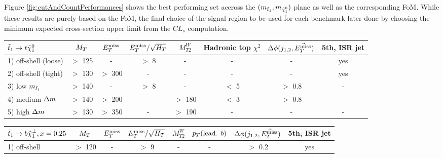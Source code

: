     Figure \ref{fig:cutAndCountPerformances} shows the best performing set accross the 
    $(m_{\tilde{t}_1},m_{\tilde{\chi}_1^0})$ plane as well as the corresponding FoM. While
    these results are purely based on the FoM, the final choice of the signal region to
    be used for each benchmark later done by choosing the minimum expected cross-section 
    upper limit from the $CL_s$ computation.

\begin{table}[!ht]
{\footnotesize
\begin{center}
\hspace*{-0.8cm}
    \begin{tabular}{|l|ccccccc|}
    \hline
    $\tilde{t}_1 \rightarrow t\tilde{\chi}_1^0$ & $M_T$   & $E_T^\text{miss}$    & $E_T^\text{miss}/\sqrt{H_T}$  & $M_{T2}^W$ & Hadronic top $\chi^2$ & $\Delta\phi(j_{1,2},\vec{E_T^\text{miss}})$      &   5th, ISR jet \\
    \hline                                                                                                                                     
    1) off-shell (loose)       & $>$ 125 & -       &   $>$ 8            &     -     & -             &          - &    yes        \\
    2) off-shell (tight)       & $>$ 130 & $>$ 300 &   -                &     -     & -        	    &          - &    yes        \\
    3) low    $m_{\tilde{t}_1}$  & $>$ 140 & -       &   $>$ 8            &     -     &  $<$ 5        &  $>$ 0.8   &    -          \\
    4) medium $\Delta m$        & $>$ 140 & $>$ 200 &   -                &  $>$ 180  &  $<$ 3        &  $>$ 0.8   &    -          \\
    5) high   $\Delta m$        & $>$ 130 & $>$ 350 &   -                &  $>$ 190  & -             &          - &    -          \\
        \hline
    \end{tabular}
    \hspace*{-0.5cm}
    \begin{tabular}{|l|ccccccc|}
    \hline
    $\tilde{t}_1 \rightarrow b\tilde{\chi}_1^\pm, x=0.25$   & $M_T$     & $E_T^\text{miss}$    & $E_T^\text{miss}/\sqrt{H_T}$ & $M_{T2}^W$ & $p_T(\text{lead. }b)$ & $\Delta\phi(j_{1,2},\vec{E_T^\text{miss}})$ & 5th, ISR jet  \\
    \hline                                                                                                                      
    1) off-shell        & $>$ 120   &  -       &    $>$  9       &     -      &   -                   &  $>$ 0.2      & yes           \\

\end{tabular}
\end{center}}
\end{table}
